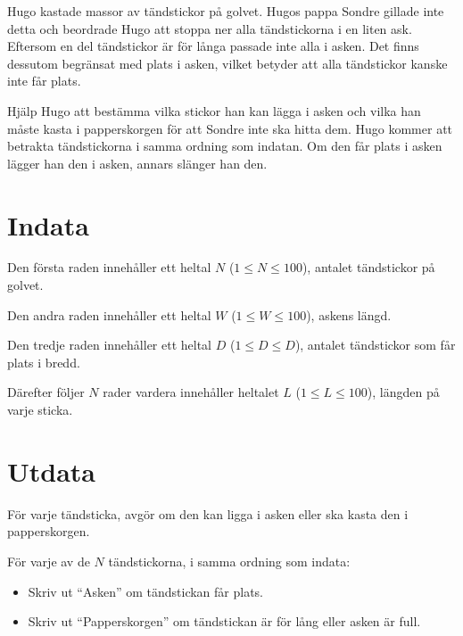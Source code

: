 Hugo kastade massor av tändstickor på golvet. Hugos pappa Sondre gillade inte detta
och beordrade Hugo att stoppa ner alla tändstickorna i en liten ask. Eftersom en del
tändstickor är för långa passade inte alla i asken. Det finns dessutom begränsat med
plats i asken, vilket betyder att alla tändstickor kanske inte får plats.

Hjälp Hugo att bestämma vilka stickor han kan lägga i asken och vilka han måste kasta
i papperskorgen för att Sondre inte ska hitta dem. Hugo kommer att betrakta tändstickorna
i samma ordning som indatan. Om den får plats i asken lägger han den i asken, annars
slänger han den.

\section*{Indata}
Den första raden innehåller ett heltal $N$ ($1 \leq N \leq 100$), antalet tändstickor på golvet.

Den andra raden innehåller ett heltal $W$ ($1 \leq W \leq 100$), askens längd.

Den tredje raden innehåller ett heltal $D$ ($1 \leq D \leq D$), antalet tändstickor som får plats i bredd.

Därefter följer $N$ rader vardera innehåller heltalet $L$ ($1 \leq L \leq 100$), längden på varje sticka.

\section*{Utdata}
För varje tändsticka, avgör om den kan ligga i asken eller ska kasta den i papperskorgen.

För varje av de $N$ tändstickorna, i samma ordning som indata:
\begin{itemize}
    \item Skriv ut ``Asken'' om tändstickan får plats.
    \item Skriv ut ``Papperskorgen'' om tändstickan är för lång eller asken är full.
\end{itemize}
